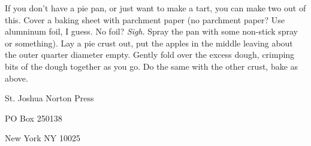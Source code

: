 \documentclass[12pt]{article}
\begin{document}
If you don't have a pie pan, or just want to make a tart, you can make two out of
this. Cover a baking sheet with parchment paper (no parchment paper? Use alumninum
foil, I guess. No foil? {\em Sigh}. Spray the pan with some non-stick spray or
something). Lay a pie crust out, put the apples in the middle leaving about the
outer quarter diameter empty. Gently fold over the excess dough, crimping bits of
the dough together as you go. Do the same with the other crust, bake as above. 

\newpage

\thispagestyle{empty}
\vspace*{12cm}
\begin{sideways}
\Large{St. Joshua Norton Press}
\end{sideways}
\begin{sideways}
\Large{PO Box 250138}
\end{sideways}
\begin{sideways}
\Large{New York NY 10025}
\end{sideways}
\end{document}
